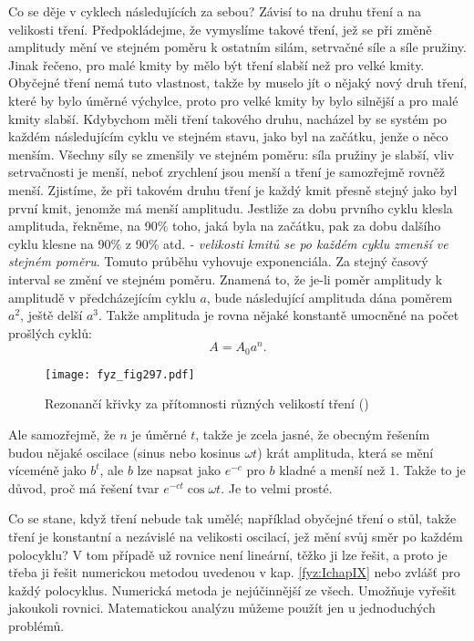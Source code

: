     Co se děje v cyklech následujících za sebou? Závisí to na druhu tření a na velikosti tření. 
    Předpokládejme, že vymyslíme takové tření, jež se při změně amplitudy mění ve stejném poměru k 
    ostatním silám, setrvačné síle a síle pružiny. Jinak řečeno, pro malé kmity by mělo být tření 
    slabší než pro velké kmity. Obyčejné tření nemá tuto vlastnost, takže by muselo jít o nějaký 
    nový druh tření, které by bylo úměrné výchylce, proto pro velké kmity by bylo silnější a pro 
    malé kmity slabší. Kdybychom měli tření takového druhu, nacházel by se systém po každém 
    následujícím cyklu ve stejném stavu, jako byl na začátku, jenže o něco menším. Všechny síly se 
    zmenšily ve stejném poměru: síla pružiny je slabší, vliv setrvačnosti je menší, neboť zrychlení 
    jsou menší a tření je samozřejmě rovněž menší. Zjistíme, že při takovém druhu tření je každý 
    kmit přesně stejný jako byl první kmit, jenomže má menší amplitudu. Jestliže za dobu prvního 
    cyklu klesla amplituda, řekněme, na 90\% toho, jaká byla na začátku, pak za dobu dalšího cyklu 
    klesne na 90\% z 90\% atd. \emph{- velikosti kmitů se po každém cyklu zmenší ve stejném 
    poměru}. Tomuto průběhu vyhovuje exponenciála. Za stejný časový interval se změní ve stejném 
    poměru. Znamená to, že je-li poměr amplitudy k amplitudě v předcházejícím cyklu \(a\), bude 
    následující amplituda dána poměrem \(a^2\), ještě delší \(a^3\). Takže amplituda je rovna 
    nějaké konstantě umocněné na počet prošlých cyklů:
    \begin{equation}\label{fyz:eq347}
      A = A_0a^n.
    \end{equation}

    \begin{figure}[ht!] %
      \centering
      \texttt{[image: fyz\_fig297.pdf]}
      \caption{Rezonančí křivky za přítomnosti různých velikostí tření 
               (\cite[s.~427]{Feynman01})}
      \label{fyz:fig297}
    \end{figure}
    
    Ale samozřejmě, že \(n\) je úměrné \(t\), takže je zcela jasné, že obecným řešením budou nějaké 
    oscilace (sinus nebo kosinus \(\omega t\)) krát amplituda, která se mění víceméně jako \(b^t\), 
    ale \(b\) lze napsat jako \(e^{-c}\) pro \(b\) kladné a menší než \(1\). Takže to je důvod, 
    proč má řešení tvar \(e^{-ct}\cos\omega t\). Je to velmi prosté.
    
    Co se stane, když tření nebude tak umělé; například obyčejné tření o stůl, takže tření je 
    konstantní a nezávislé na velikosti oscilací, jež mění svůj směr po každém polocyklu? V tom 
    případě už rovnice není lineární, těžko ji lze řešit, a proto je třeba ji řešit numerickou 
    metodou uvedenou v kap. \ref{fyz:IchapIX} nebo zvlášť pro každý polocyklus. Numerická metoda je 
    nejúčinnější ze všech. Umožňuje vyřešit jakoukoli rovnici. Matematickou analýzu můžeme použít 
    jen u jednoduchých problémů.
    
